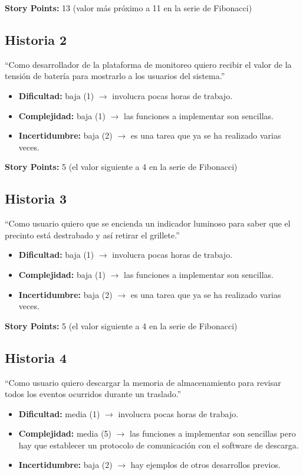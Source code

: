 \documentclass[
11pt, %
]{charter}
\begin{document}
\textbf{Story Points:} 13 (valor más próximo a 11 en la serie de Fibonacci) 

\subsection{Historia 2}
``Como desarrollador de la plataforma de monitoreo quiero recibir el valor de la tensión de batería para mostrarlo a los usuarios del sistema.''

\begin{itemize}
	\item \textbf{Dificultad:} baja (1) $\rightarrow$ involucra pocas horas de trabajo.
	\item \textbf{Complejidad:} baja (1) $\rightarrow$ las funciones a implementar son sencillas.
	\item \textbf{Incertidumbre:} baja (2) $\rightarrow$ es una tarea que ya se ha realizado varias veces.
\end{itemize}

\textbf{Story Points:} 5 (el valor siguiente a 4 en la serie de Fibonacci) 

\subsection{Historia 3}
``Como usuario quiero que se encienda un indicador luminoso para saber que el precinto está destrabado y así retirar el grillete.''

\begin{itemize}
	\item \textbf{Dificultad:} baja (1) $\rightarrow$ involucra pocas horas de trabajo.
	\item \textbf{Complejidad:} baja (1) $\rightarrow$ las funciones a implementar son sencillas.
	\item \textbf{Incertidumbre:} baja (2) $\rightarrow$ es una tarea que ya se ha realizado varias veces.
\end{itemize}

\textbf{Story Points:} 5 (el valor siguiente a 4 en la serie de Fibonacci) 

\subsection{Historia 4}
``Como usuario quiero descargar la memoria de almacenamiento para revisar todos los eventos ocurridos durante un traslado.''

\begin{itemize}
	\item \textbf{Dificultad:} media (1) $\rightarrow$ involucra pocas horas de trabajo.
	\item \textbf{Complejidad:} media (5) $\rightarrow$ las funciones a implementar son sencillas pero hay que establecer un protocolo de comunicación con el software de descarga.
	\item \textbf{Incertidumbre:} baja (2) $\rightarrow$ hay ejemplos de otros desarrollos previos.
\end{itemize}
\end{document}
